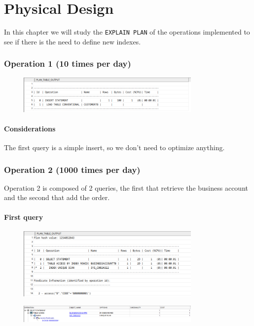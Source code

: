 \chapter{Physical Design}

In this chapter we will study the \texttt{EXPLAIN PLAN} of the operations implemented to see if there is the need to define new indexes.

\subsection*{Operation 1 (10 times per day)}
\begin{figure}[H]
    \centering
    \includegraphics[width=0.8\textwidth]{img/phys/op1-1.png}
\end{figure}

\subsubsection*{Considerations}
The first query is a simple insert, so we don't need to optimize anything.

\subsection*{Operation 2 (1000 times per day)}
Operation 2 is composed of 2 queries, the first that retrieve the business account and the second that add the order.
\subsubsection*{First query}
\begin{figure}[H]
    \centering
    \includegraphics[width=0.8\textwidth]{img/phys/op2-1.png}
\end{figure}
\begin{figure}[H]
    \centering
    \includegraphics[width=0.8\textwidth]{img/phys/op2-3.png}
\end{figure}

